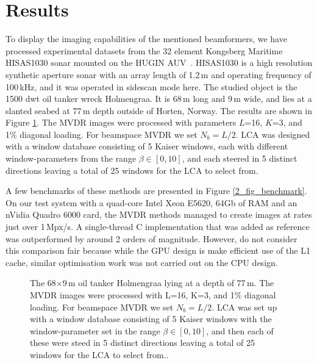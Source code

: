 {%


\section{Results}


To display the imaging capabilities of the mentioned beamformers, we have processed experimental datasets from the 32 element Kongsberg Maritime HISAS1030 sonar mounted on the HUGIN AUV~\cite{Hansen2009}. HISAS1030 is a high resolution synthetic aperture sonar with an array length of 1.2\,m and operating frequency of 100\,kHz, and it was operated in sidescan mode here. The studied object is the 1500 dwt oil tanker wreck Holmengraa. It is 68\,m long and 9\,m wide, and lies at a slanted seabed at 77\,m depth outside of Horten, Norway. The results are shown in Figure \ref{2_fig_holmengraa}. The MVDR images were processed with parameters $L$=16, $K$=3, and 1\% diagonal loading. For beamspace MVDR we set $N_b=L/2$. LCA was designed with a window database consisting of 5 Kaiser windows, each with different window-parameters from the range $\beta\in[0,10]$, and each steered in 5 distinct directions leaving a total of 25 windows for the LCA to select from.

A few benchmarks of these methods are presented in Figure \ref{2_fig_benchmark}. On our test system with a quad-core Intel Xeon E5620, 64Gb of RAM and an nVidia Quadro 6000 card, the MVDR methods managed to create images at rates just over 1\,Mpx/s. A single-thread C implementation that was added as reference was outperformed by around 2 orders of magnitude. However, do not consider this comparison fair because while the GPU design is make efficient use of the L1 cache, similar optimisation work was not carried out on the CPU design.

\begin{figure}[!t]\centering%
%
\caption{The 68$\times$9\,m oil tanker Holmengraa lying at a depth of 77\,m. The MVDR images were processed with L=16, K=3, and 1\% diagonal loading. For beamspace MVDR we set $N_b=L/2$. LCA was set up with a window database consisting of 5 Kaiser windows with the window-parameter set in the range $\beta\in[0,10]$, and then each of these were steed in 5 distinct directions leaving a total of 25 windows for the LCA to select from..}\label{2_fig_holmengraa}
\end{figure}

}

